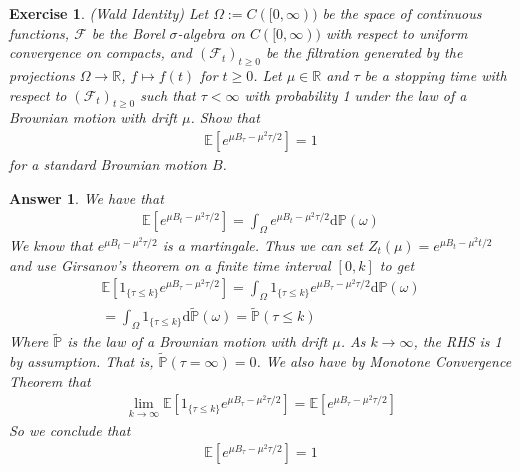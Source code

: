 \documentclass[12pt]{article}
\theoremstyle{colon}
\newtheorem{exercise}{Exercise}
\newtheorem*{answer}{Answer}
\begin{document}
\clearpage

\begin{exercise}
  (Wald Identity) Let $\Omega := C([0, \infty))$ be the space of continuous functions, $\mathcal{F}$ be the Borel $\sigma$-algebra on $C([0, \infty))$ with respect to uniform convergence on compacts, and $(\mathcal{F}_t)_{t \geq 0}$ be the filtration generated by the projections $\Omega \rightarrow \mathbb{R}$, $f \mapsto f(t)$ for $t \geq 0$. Let $\mu \in \mathbb{R}$ and $\tau$ be a stopping time with respect to $(\mathcal{F}_t)_{t \geq 0}$ such that $\tau < \infty$ with probability 1 under the law of a Brownian motion with drift $\mu$. Show that
  \begin{gather*}
    \mathbb{E} \left[ e^{\mu B_\tau - \mu^2 \tau/2} \right] = 1
  \end{gather*}
  for a standard Brownian motion $B$.
\end{exercise}

\begin{answer}
  We have that
  \begin{gather*}
    \mathbb{E} \left[ e^{\mu B_t - \mu^2 \tau/2} \right] = \int_\Omega e^{\mu B_t - \mu^2 \tau/2} \text{d} \mathbb{P}(\omega)
  \end{gather*}
  We know that $e^{\mu B_t - \mu^2 \tau/2}$ is a martingale. Thus we can set $Z_t(\mu) = e^{\mu B_t - \mu^2 t/2}$ and use Girsanov's theorem on a finite time interval $[0,k]$ to get
  \begin{gather*}
    \mathbb{E} \left[ 1_{\{\tau \leq k\}} e^{\mu B_\tau - \mu^2 \tau/2} \right] = \int_\Omega 1_{\{\tau \leq k\}} e^{\mu B_\tau - \mu^2 \tau/2} \text{d} \mathbb{P}(\omega) \\
    = \int_\Omega 1_{\{\tau \leq k\}} \text{d} \mathbb{\tilde{P}}(\omega) = \mathbb{\tilde{P}} (\tau \leq k)
  \end{gather*}
  Where $\mathbb{\tilde{P}}$ is the law of a Brownian motion with drift $\mu$. As $k \rightarrow \infty$, the RHS is 1 by assumption. That is, $\mathbb{\tilde{P}} (\tau = \infty) = 0$. We also have by Monotone Convergence Theorem that
  \begin{gather*}
    \lim_{k \rightarrow \infty} \mathbb{E} \left[ 1_{\{\tau \leq k\}} e^{\mu B_\tau - \mu^2 \tau/2} \right] = \mathbb{E} \left[ e^{\mu B_\tau - \mu^2 \tau/2} \right]
  \end{gather*}
  So we conclude that
  \begin{gather*}
    \mathbb{E} \left[ e^{\mu B_\tau - \mu^2 \tau/2} \right] = 1
  \end{gather*}
\end{answer}
\end{document}
